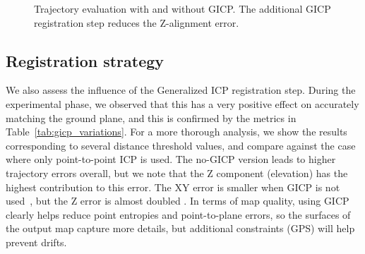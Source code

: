 \begin{figure}[H]
    \centering
    \hspace{1pt}
    \caption[Trajectory evaluation with and without GICP]{Trajectory evaluation with and without GICP. The additional GICP registration step reduces the Z-alignment error.}
    \label{fig:gicp-traj-result}
\end{figure}

\subsection{Registration strategy}

We also assess the influence of the Generalized ICP registration step. During the experimental phase, we observed that this has a very positive effect on accurately matching the ground plane, and this is confirmed by the metrics in Table~\ref{tab:gicp_variations}. For a more thorough analysis, we show the results corresponding to several distance threshold values, and compare against the case where only point-to-point ICP is used. The no-GICP version leads to higher trajectory errors overall, but we note that the Z component (elevation) has the highest contribution to this error. The XY error is smaller when GICP is not used~, but the Z error is almost doubled . In terms of map quality, using GICP clearly helps reduce point entropies and point-to-plane errors, so the surfaces of the output map capture more details, but additional constraints (\ie GPS) will help prevent drifts.

